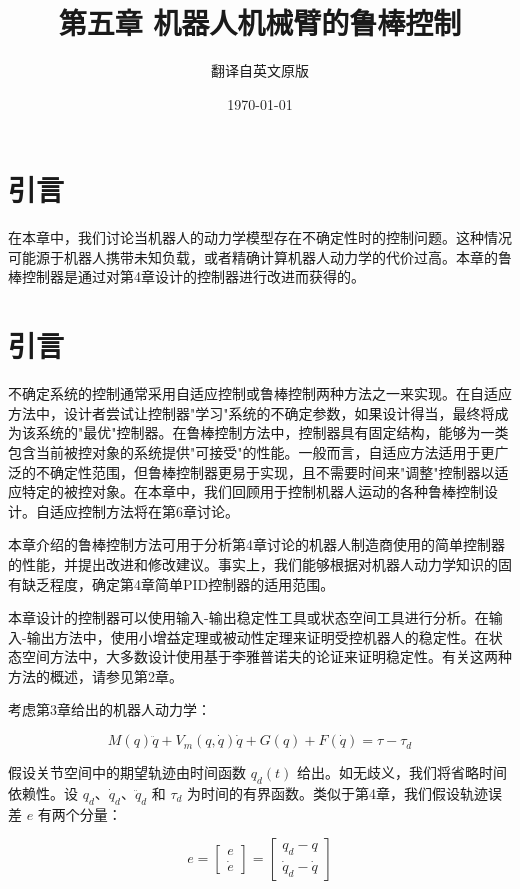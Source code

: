 \documentclass[UTF8,12pt,a4paper]{ctexart}
\title{第五章 机器人机械臂的鲁棒控制}
\author{翻译自英文原版}
\date{\today}
\begin{document}
\maketitle

\section*{引言}

在本章中，我们讨论当机器人的动力学模型存在不确定性时的控制问题。这种情况可能源于机器人携带未知负载，或者精确计算机器人动力学的代价过高。本章的鲁棒控制器是通过对第4章设计的控制器进行改进而获得的。

\section{引言}

不确定系统的控制通常采用自适应控制或鲁棒控制两种方法之一来实现。在自适应方法中，设计者尝试让控制器"学习"系统的不确定参数，如果设计得当，最终将成为该系统的"最优"控制器。在鲁棒控制方法中，控制器具有固定结构，能够为一类包含当前被控对象的系统提供"可接受"的性能。一般而言，自适应方法适用于更广泛的不确定性范围，但鲁棒控制器更易于实现，且不需要时间来"调整"控制器以适应特定的被控对象。在本章中，我们回顾用于控制机器人运动的各种鲁棒控制设计。自适应控制方法将在第6章讨论。

本章介绍的鲁棒控制方法可用于分析第4章讨论的机器人制造商使用的简单控制器的性能，并提出改进和修改建议。事实上，我们能够根据对机器人动力学知识的固有缺乏程度，确定第4章简单PID控制器的适用范围。

本章设计的控制器可以使用输入-输出稳定性工具或状态空间工具进行分析。在输入-输出方法中，使用小增益定理或被动性定理来证明受控机器人的稳定性。在状态空间方法中，大多数设计使用基于李雅普诺夫的论证来证明稳定性。有关这两种方法的概述，请参见第2章。

考虑第3章给出的机器人动力学：

\begin{equation}\label{eq:5.1.1}
M(q)\ddot{q} + V_m(q, \dot{q})\dot{q} + G(q) + F(\dot{q}) = \tau - \tau_d
\end{equation}

假设关节空间中的期望轨迹由时间函数 $q_d(t)$ 给出。如无歧义，我们将省略时间依赖性。设 $q_d$、$\dot{q}_d$、$\ddot{q}_d$ 和 $\tau_d$ 为时间的有界函数。类似于第4章，我们假设轨迹误差 $e$ 有两个分量：

\begin{equation}\label{eq:5.1.2}
e = \begin{bmatrix} e \\ \dot{e} \end{bmatrix} = \begin{bmatrix} q_d - q \\ \dot{q}_d - \dot{q} \end{bmatrix}
\end{equation}
\end{document}
